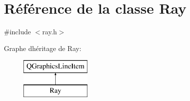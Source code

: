 \hypertarget{class_ray}{}\section{Référence de la classe Ray}
\label{class_ray}


{\ttfamily \#include $<$ray.\+h$>$}

Graphe d\textquotesingle{}héritage de Ray\+:\begin{figure}[H]
\begin{center}
\leavevmode
\includegraphics[height=2.000000cm]{class_ray}
\end{center}
\end{figure}
